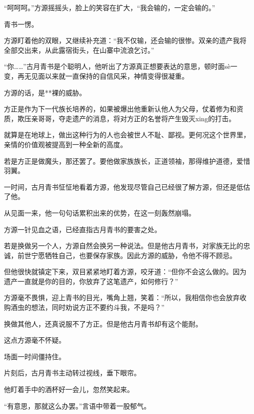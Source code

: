 \begin{this_body}
“呵呵呵。”方源摇摇头，脸上的笑容在扩大，“我会输的，一定会输的。”

青书一愣。

方源盯着他的双眼，又继续补充道：“我不仅输，还会输的很惨。双亲的遗产我将全部交出来，从此露宿街头，在山寨中流浪乞讨。”

“你……”古月青书是个聪明人，他听出了方源真正想要表达的意思，顿时面sè一变，再无见面以来就一直保持的自信风采，神情变得很凝重。

方源的话，是**裸的威胁。

方正是作为下一代族长培养的，如果被爆出他重新认他人为父母，仗着修为和资质，欺压亲哥哥，夺走遗产的消息，将对方正的名誉将产生毁灭xing的打击。

就算是在地球上，做出这种行为的人也会被世人不耻、鄙视。更何况这个世界里，亲情的价值观被提高到一种全新的高度。

若是方正是做魔头，那还罢了。要他做家族族长，正道领袖，那得维护道德，爱惜羽翼。

一时间，古月青书怔怔地看着方源，他发现尽管自己已经很了解方源，但还是低估了他。

从见面一来，他一句句话累积出来的优势，在这一刻轰然崩塌。

方源一针见血之语，已经直指古月青书的要害之处。

若是换做另一个人，方源自然会换另一种说法。但是他古月青书，对家族无比的忠诚，前世宁愿牺牲自己，也要保存家族。因此方源的威胁，令他不得不顾忌。

但他很快就镇定下来，双目紧紧地盯着方源，咬牙道：“但你不会这么做的。因为遗产一直就是你的目的，你放弃了这笔遗产，如何修行？”

方源毫不畏惧，迎上青书的目光，嘴角上翘，笑着：“所以，我相信你也会放弃收购酒虫的想法，同时劝说方正不要约斗我，不是吗？”

换做其他人，还真说服不了方正。但是他古月青书却有这个能耐。

这点方源毫不怀疑。

场面一时间僵持住。

片刻后，古月青书主动转过视线，垂下眼帘。

他盯着手中的酒杯好一会儿，忽然笑起来。

“有意思，那就这么办罢。”言语中带着一股郁气。

\end{this_body}


